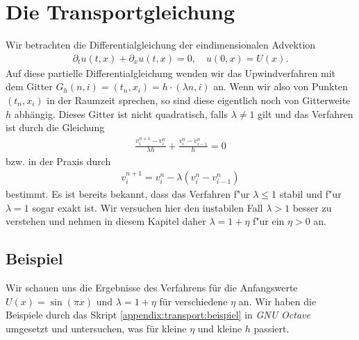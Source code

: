 \section{Die Transportgleichung}

Wir betrachten die Differentialgleichung der eindimensionalen Advektion
\begin{align}\label{eq:adv:pde}
\partial_t u(t, x) + \partial_x u(t, x) = 0, \quad u(0, x) = U(x).
\end{align}
Auf diese partielle Differentialgleichung wenden wir das Upwindverfahren mit dem Gitter $G_h(n,i) = (t_n, x_i) = h \cdot (\lambda n, i)$ an.
Wenn wir also von Punkten $(t_n, x_i)$ in der Raumzeit sprechen, so sind diese eigentlich noch von Gitterweite $h$ abhängig. 
Dieses Gitter ist nicht quadratisch, falls $\lambda \neq 1$ gilt und das Verfahren ist durch die Gleichung
\begin{align}\label{eq:adv:scheme_rechnung}
\frac {v^{n+1}_i - v^n_i} {\lambda h} + \frac {v^n_i - v^n_{i-1}} h = 0
\end{align}
bzw. in der Praxis durch
\begin{align}\label{eq:adv:scheme}
v^{n+1}_i = v^n_i - \lambda (v^n_i - v^n_{i-1})
\end{align}
bestimmt.
Es ist bereits bekannt, dass das Verfahren f"ur $\lambda \leq 1$ stabil und f"ur $\lambda = 1$ sogar exakt ist.
Wir versuchen hier den instabilen Fall $\lambda > 1$ besser zu verstehen und nehmen in diesem Kapitel daher $\lambda = 1 + \eta$ f"ur ein $\eta > 0$ an.



\subsection{Beispiel}\label{sec:transport:beispiel}

Wir schauen uns die Ergebnisse des Verfahrens für die Anfangswerte $U(x) = \sin(\pi x)$ und $\lambda = 1 + \eta$ für verschiedene $\eta$ an.
Wir haben die Beispiele durch das Skript \ref{appendix:transport:beispiel} in \emph{GNU Octave} umgesetzt und untersuchen, was für kleine $\eta$ und kleine $h$ passiert.

